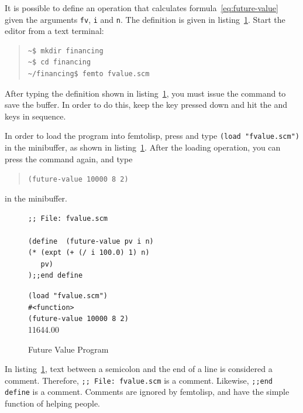 \documentclass[a4paper,12pt]{book}
\newenvironment{fmpage}[1]
           {\begin{lrbox}{\fmbox}\begin{minipage}{#1}}
           {\end{minipage}\end{lrbox}\fbox{\usebox{\fmbox}}}
\begin{document}
It is possible to define an operation that
calculates formula~\ref{eq:future-value}
given the arguments \verb|fv|, \verb|i|
and \verb|n|. The definition is given
in listing~\ref{Texan:parking}.
Start the editor from a text terminal:
\begin{quote}
\begin{verbatim}
~$ mkdir financing
~$ cd financing
~/financing$ femto fvalue.scm
\end{verbatim}
\end{quote}
After typing the definition shown
in listing~\ref{Texan:parking},
you must issue the 
command to save the buffer.
In order to do this, keep the
 key pressed down and
hit the  and
 keys in sequence.

In order to load the program into
femtolisp, press 
and type \verb|(load "fvalue.scm")|
in the minibuffer, as shown in
listing~\ref{Texan:parking}.
After the loading operation,
you can press the
 command again,
and type
\begin{quote}
\verb|(future-value 10000 8 2)|
\end{quote}
in the minibuffer.

\begin{figure}[!h]
\begin{fmpage}{0.8\textwidth}
\begin{verbatim}
;; File: fvalue.scm

(define  (future-value pv i n)
(* (expt (+ (/ i 100.0) 1) n) 
   pv)
);;end define
\end{verbatim}
\end{fmpage}

\begin{fmpage}{0.8\textwidth}
\verb|(load "fvalue.scm")|\\
\verb|#<function>|\\
\verb|(future-value 10000 8 2)|\\
11644.00
\end{fmpage}
\caption{Future Value Program}
\label{Texan:parking}
\end{figure}

In listing~\ref{Texan:parking}, text
between a semicolon and the end of
a line is considered a comment.
Therefore, \verb|;; File: fvalue.scm|
is a comment. Likewise, \verb|;;end define|
is a comment. Comments are ignored by
femtolisp, and have the simple function of
helping people.
\end{document}
